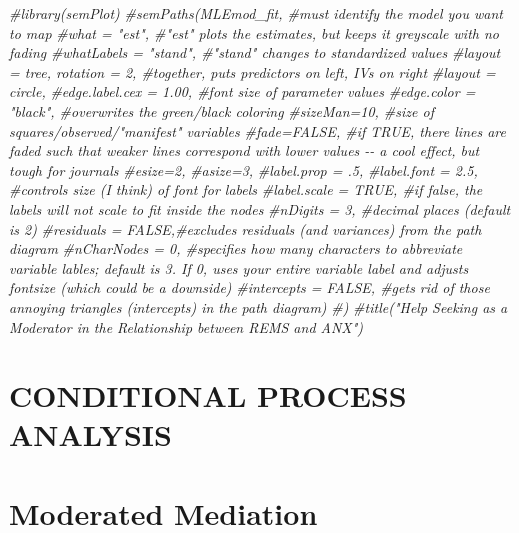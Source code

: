 \documentclass[
  11pt,
]{book}
\newenvironment{Shaded}{\begin{snugshade}}{\end{snugshade}}
\newcommand{\CommentTok}[1]{\textcolor[rgb]{0.56,0.35,0.01}{\textit{#1}}}
\begin{document}
\begin{Shaded}
\begin{Highlighting}[]
\CommentTok{\#library(semPlot)}
\CommentTok{\#semPaths(MLEmod\_fit, \#must identify the model you want to map}
        \CommentTok{\#what = "est", \#"est" plots the estimates, but keeps it greyscale with no fading}
         \CommentTok{\#whatLabels = "stand", \#"stand" changes to standardized values}
         \CommentTok{\#layout = \textquotesingle{}tree\textquotesingle{}, rotation = 2, \#together, puts predictors on left, IVs on right }
         \CommentTok{\#layout = \textquotesingle{}circle\textquotesingle{},}
         \CommentTok{\#edge.label.cex = 1.00, \#font size of parameter values}
         \CommentTok{\#edge.color = "black", \#overwrites the green/black coloring}
         \CommentTok{\#sizeMan=10, \#size of squares/observed/"manifest" variables}
         \CommentTok{\#fade=FALSE, \#if TRUE, there lines are faded such that weaker lines correspond with lower values {-}{-} a cool effect, but tough for journals}
         \CommentTok{\#esize=2, }
         \CommentTok{\#asize=3,}
         \CommentTok{\#label.prop = .5,}
         \CommentTok{\#label.font = 2.5, \#controls size (I think) of font for labels}
         \CommentTok{\#label.scale = TRUE, \#if false, the labels will not scale to fit inside the nodes}
         \CommentTok{\#nDigits = 3, \#decimal places (default is 2)}
         \CommentTok{\#residuals = FALSE,\#excludes residuals (and variances) from the path diagram}
         \CommentTok{\#nCharNodes = 0, \#specifies how many characters to abbreviate variable lables; default is 3.  If 0, uses your entire variable label and adjusts fontsize (which could be a downside)}
         \CommentTok{\#intercepts = FALSE, \#gets rid of those annoying triangles (intercepts) in the path diagram)}
\CommentTok{\#)}
\CommentTok{\#title("Help Seeking as a Moderator in the Relationship between REMS and ANX")}
\end{Highlighting}
\end{Shaded}

\hypertarget{CPAnal}{%
\chapter*{CONDITIONAL PROCESS ANALYSIS}\label{CPAnal}}

\hypertarget{ModMed}{%
\chapter{Moderated Mediation}\label{ModMed}}
\end{document}
